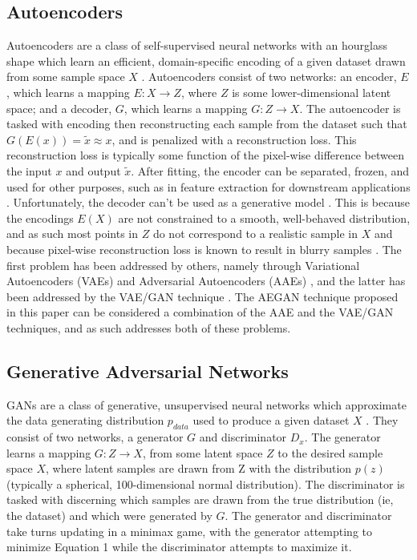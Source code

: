 \documentclass{article}
\begin{document}
\subsection{Autoencoders}
Autoencoders are a class of self-supervised neural networks with an hourglass shape which learn an efficient, domain-specific encoding of a given dataset drawn from some sample space $X$ \cite{kramer_1991}. Autoencoders consist of two networks: an encoder, $E$, which learns a mapping $E: X \rightarrow Z$, where $Z$ is some lower-dimensional latent space; and a decoder, $G$, which learns a mapping $G: Z \rightarrow X$. The autoencoder is tasked with encoding then reconstructing each sample from the dataset such that $G(E(x))=\widetilde{x} \approx x$, and is penalized with a reconstruction loss. This reconstruction loss is typically some function of the pixel-wise difference between the input $x$ and output $\widetilde{x}$. After fitting, the encoder can be separated, frozen, and used for other purposes, such as in feature extraction for downstream applications \cite{Ryu2020}. Unfortunately, the decoder can't be used as a generative model \cite{foster_2019}. This is because the encodings $E(X)$ are not constrained to a smooth, well-behaved distribution, and as such most points in $Z$ do not correspond to a realistic sample in $X$ \cite{foster_2019} and because pixel-wise reconstruction loss is known to result in blurry samples \cite{larsen2015autoencoding}. The first problem has been addressed by others, namely through Variational Autoencoders (VAEs) \cite{kingma2013autoencoding} and Adversarial Autoencoders (AAEs) \cite{makhzani2015adversarial}, and the latter has been addressed by the VAE/GAN technique \cite{larsen2015autoencoding}. The AEGAN technique proposed in this paper can be considered a combination of the AAE and the VAE/GAN techniques, and as such addresses both of these problems.

\subsection{Generative Adversarial Networks}
GANs are a class of generative, unsupervised neural networks which approximate the data generating distribution $p_{data}$ used to produce a given dataset $X$ \cite{goodfellow2014generative}. They consist of two networks, a generator $G$ and discriminator $D_x$. The generator learns a mapping $G: Z \rightarrow X$, from some latent space $Z$ to the desired sample space $X$, where latent samples are drawn from Z with the distribution $p(z)$ (typically a spherical, 100-dimensional normal distribution). The discriminator is tasked with discerning which samples are drawn from the true distribution (ie, the dataset) and which were generated by $G$. The generator and discriminator take turns updating in a minimax game, with the generator attempting to minimize Equation 1 while the discriminator attempts to maximize it.
\end{document}
